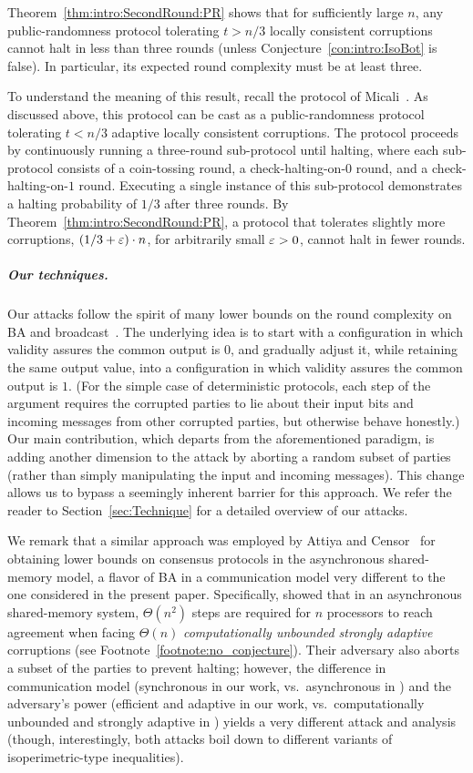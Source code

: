 Theorem~\ref{thm:intro:SecondRound:PR} shows that for sufficiently large $n$, any public-randomness protocol tolerating $t>n/3$ locally consistent corruptions cannot halt in less than three rounds (unless Conjecture~\ref{con:intro:IsoBot} is false). In particular, its expected round complexity must be at least three.

To understand the meaning of this result, recall the protocol of Micali~\cite{Micali17}. As discussed above, this protocol can be cast as a public-randomness protocol tolerating $t<n/3$ adaptive locally consistent corruptions. The protocol proceeds by continuously running a three-round sub-protocol until halting, where each sub-protocol consists of a coin-tossing round, a check-halting-on-$0$ round, and a check-halting-on-$1$ round. Executing a single instance of this sub-protocol demonstrates a halting probability of $1/3$ after three rounds.
By Theorem~\ref{thm:intro:SecondRound:PR}, a protocol that tolerates slightly more corruptions, \ie $(1/3 +\varepsilon) \cdot n$, for arbitrarily small $\varepsilon>0$, cannot halt in fewer rounds.


\subparagraph{Our techniques.}
Our attacks follow the spirit of many lower bounds on the round complexity on BA and broadcast~\cite{FL82,DS83,KY86,DRS90,GKKO07,AH10}. The underlying idea is to start with a configuration in which validity assures the common output is $0$, and gradually adjust it, while retaining the same output value, into a configuration in which validity assures the common output is $1$. (For the simple case of deterministic protocols, each step of the argument requires the corrupted parties to lie about their input bits and incoming messages from other corrupted parties, but otherwise behave honestly.) Our main contribution, which departs from the aforementioned paradigm, is adding another dimension to the attack by aborting a random subset of parties (rather than simply manipulating the input and incoming messages). This change allows us to bypass a seemingly inherent barrier for this approach. We refer the reader to Section~\ref{sec:Technique} for a detailed overview of our attacks.

We remark that a similar approach was employed by Attiya and Censor~\cite{AC08} for obtaining lower bounds on consensus protocols in the asynchronous shared-memory model, a flavor of BA in a communication model very different to the one considered in the present paper. Specifically, \cite{AC08} showed that in an asynchronous shared-memory system, $\Theta(n^2)$ steps are required for $n$ processors to reach agreement when facing $\Theta(n)$ \emph{computationally unbounded strongly adaptive} corruptions (see Footnote~\ref{footnote:no_conjecture}). Their adversary also aborts a subset of the parties to prevent halting; however, the difference in communication model (synchronous in our work, vs.\ asynchronous in \cite{AC08}) and the adversary's power (efficient and adaptive in our work, vs.\ computationally unbounded and strongly adaptive in \cite{AC08}) yields a very different attack and analysis (though, interestingly, both attacks boil down to different variants of isoperimetric-type inequalities).

